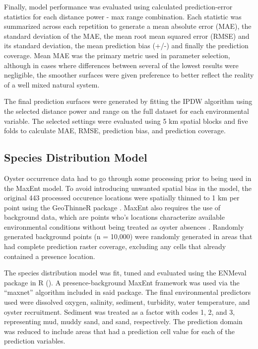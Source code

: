 \documentclass[
  review]{elsarticle}
\begin{document}
Finally, model performance was evaluated using calculated
prediction-error statistics for each distance power - max range
combination. Each statistic was summarized across each repetition to
generate a mean absolute error (MAE), the standard deviation of the MAE,
the mean root mean squared error (RMSE) and its standard deviation, the
mean prediction bias (+/-) and finally the prediction coverage. Mean MAE
was the primary metric used in parameter selection, although in cases
where differences between several of the lowest results were negligible,
the smoother surfaces were given preference to better reflect the
reality of a well mixed natural system.

The final prediction surfaces were generated by fitting the IPDW
algorithm using the selected distance power and range on the full
dataset for each environmental variable. The selected settings were
evaluated using 5 km spatial blocks and five folds to calculate MAE,
RMSE, prediction bias, and prediction coverage.

\subsection{Species Distribution
Model}\label{species-distribution-model}

Oyster occurrence data had to go through some processing prior to being
used in the MaxEnt model. To avoid introducing unwanted spatial bias in
the model, the original 443 processed occurence locations were spatially
thinned to 1 km per point using the GeoThinneR package
\citep{GeoThinneR}. MaxEnt also requires the use of background data,
which are points who's locations characterize available environmental
conditions without being treated as oyster absences
\citep{Phillips2006, Elith2011, Phillips2009}. Randomly generated
background points (n = 10,000) were randomly generated in areas that had
complete prediction raster coverage, excluding any cells that already
contained a presence location.

The species distribution model was fit, tuned and evaluated using the
ENMeval package in R (\citet{Kass2021}). A presence-background MaxEnt
framework was used via the ``maxnet'' algorithm included in said
package. The final environmental predictors used were dissolved oxygen,
salinity, sediment, turbidity, water temperature, and oyster
recruitment. Sediment was treated as a factor with codes 1, 2, and 3,
representing mud, muddy sand, and sand, respectively. The prediction
domain was reduced to include areas that had a prediction cell value for
each of the prediction variables.
\end{document}
